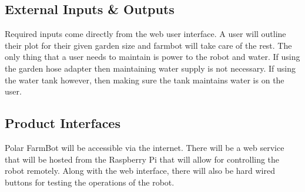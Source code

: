 \subsection{External Inputs \& Outputs}
Required inputs come directly from the web user interface. A user will outline their plot for their given garden size and farmbot will take care of the rest. The only thing that a user needs to maintain is power to the robot and water. If using the garden hose adapter then maintaining water supply is not necessary. If using the water tank however, then making sure the tank maintains water is on the user.

\subsection{Product Interfaces}
Polar FarmBot will be accessible via the internet. There will be a web service that will be hosted from the Raspberry Pi that will allow for controlling the robot remotely. Along with the web interface, there will also be hard wired buttons for testing the operations of the robot.
